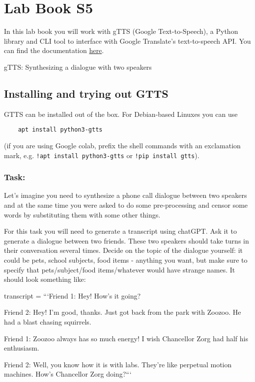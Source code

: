 \documentclass{../labbook}
\begin{document}
\section{Lab Book S5}
\noindent In this lab book you will work with gTTS (Google Text-to-Speech), a Python library and CLI tool to interface with Google Translate's text-to-speech API. 
You can find the documentation \href{http://gtts.readthedocs.org/}{here}.

\begin{problem}{1}{10}{gTTS: Synthesizing a dialogue with two speakers}

\subsection*{Installing and trying out GTTS}
GTTS can be installed out of the box. For Debian-based Linuxes you can use 
\begin{verbatim} 
    apt install python3-gtts
\end{verbatim} (if you are using Google colab, prefix the shell commands with an exclamation mark, e.g. 
\texttt{!apt install python3-gtts} or \texttt{!pip install gtts}).
\smallskip

\subsubsection*{Task:}
\noindent Let's imagine you need to synthesize a phone call dialogue between two speakers and at the same time you were asked to do some pre-processing and censor some words by substituting them with some other things. 

For this task you will need to generate a transcript using chatGPT. 
Ask it to generate a dialogue between two friends. These two speakers should take turns in their conversation several times. 
Decide on the topic of the dialogue yourself: it could be pets, school subjects, food items - anything you want, but make sure to specify that pets/subject/food items/whatever would have strange names. It should look something like:
    
transcript = ```Friend 1: Hey! How's it going?
    
Friend 2: Hey! I'm good, thanks. Just got back from the park with Zoozoo. He had a blast chasing squirrels.

Friend 1: Zoozoo always has so much energy! I wish Chancellor Zorg had half his enthusiasm.

Friend 2: Well, you know how it is with labs. They're like perpetual motion machines. How's Chancellor Zorg doing?```



\end{problem}
\end{document}

